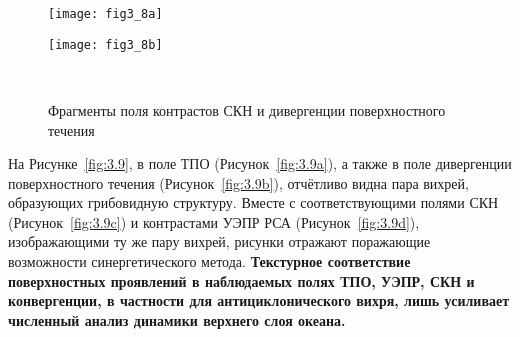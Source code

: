 \begin{figure}[H]
   	\centering
	\begin{minipage}{.47\textwidth}
	    \subcaptionbox{\label{fig:3.8a}}
		{\texttt{[image: fig3\_8a]}}
	\end{minipage}
	\hfill
	\begin{minipage}{.47\textwidth}
	    \subcaptionbox{\label{fig:3.8b}}
		{\texttt{[image: fig3\_8b]}}
	\end{minipage}
    \\
    \caption{Фрагменты поля контрастов СКН и дивергенции поверхностного течения}
    \label{fig:3.8}
\end{figure}


На Рисунке~\ref{fig:3.9}, в поле ТПО (Рисунок~\ref{fig:3.9a}), а также в поле дивергенции поверхностного течения (Рисунок~\ref{fig:3.9b}), отчётливо видна пара вихрей, образующих грибовидную структуру. Вместе с соответствующими полями СКН (Рисунок~\ref{fig:3.9c}) и контрастами УЭПР РСА (Рисунок~\ref{fig:3.9d}), изображающими ту же пару вихрей, рисунки отражают поражающие возможности синергетического метода. \textbf{Текстурное соответствие поверхностных проявлений в наблюдаемых полях ТПО, УЭПР, СКН и конвергенции, в частности для антициклонического вихря, лишь усиливает численный анализ динамики верхнего слоя океана.}



